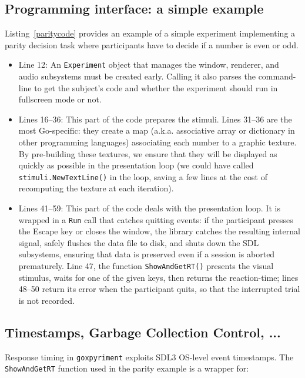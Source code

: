 \documentclass[doc,a4paper,floatsintext]{apa7}
\begin{document}
\subsection{Programming interface: a simple example}\label{example}

Listing~\vref{paritycode} provides an example of a simple experiment
implementing a parity decision task where participants have to decide
if a number is even or odd.

\begin{itemize}
\item Line 12: An \texttt{Experiment} object that manages the
window, renderer, and audio subsystems must be created
early. Calling it also parses the command-line to get the subject's
code and whether the experiment should run in fullscreen mode or not.

\item Lines 16--36: This part of the code prepares the stimuli. Lines
31--36 are the most Go-specific: they create a map (a.k.a. associative
array or dictionary in other programming languages) associating each
number to a graphic texture. By pre-building these textures, we ensure
that they will be displayed as quickly as possible in the presentation
loop (we could have called \texttt{stimuli.NewTextLine()} in the loop,
saving a few lines at the cost of recomputing the texture at each
iteration).

\item Lines 41--59: This part of the code deals with the presentation
  loop. It is wrapped in a \texttt{Run} call that catches quitting
  events: if the participant presses the Escape key or closes the
  window, the library catches the resulting internal signal, safely
  flushes the data file to disk, and shuts down the SDL subsystems,
  ensuring that data is preserved even if a session is aborted
  prematurely. Line 47, the function \texttt{ShowAndGetRT()} presents
  the visual stimulus, waits for one of the given keys, then returns
  the reaction-time; lines 48--50 return its error when the participant
  quits, so that the interrupted trial is not recorded.
\end{itemize}

\subsection{Timestamps, Garbage Collection Control, ...}

Response timing in \texttt{goxpyriment} exploits SDL3 OS-level event
timestamps. The \verb|ShowAndGetRT| function used in the parity example is
a wrapper for:
\end{document}
